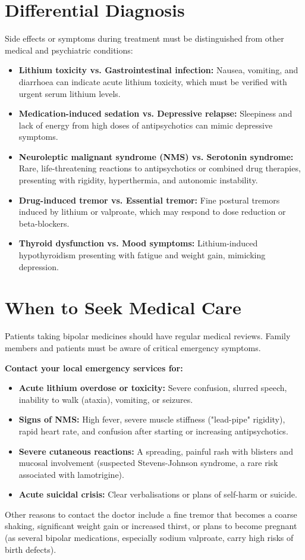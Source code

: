 \section*{Differential Diagnosis}
Side effects or symptoms during treatment must be distinguished from other medical and psychiatric conditions:
\begin{itemize}
    \item \textbf{Lithium toxicity vs. Gastrointestinal infection:} Nausea, vomiting, and diarrhoea can indicate acute lithium toxicity, which must be verified with urgent serum lithium levels.
    \item \textbf{Medication-induced sedation vs. Depressive relapse:} Sleepiness and lack of energy from high doses of antipsychotics can mimic depressive symptoms.
    \item \textbf{Neuroleptic malignant syndrome (NMS) vs. Serotonin syndrome:} Rare, life-threatening reactions to antipsychotics or combined drug therapies, presenting with rigidity, hyperthermia, and autonomic instability.
    \item \textbf{Drug-induced tremor vs. Essential tremor:} Fine postural tremors induced by lithium or valproate, which may respond to dose reduction or beta-blockers.
    \item \textbf{Thyroid dysfunction vs. Mood symptoms:} Lithium-induced hypothyroidism presenting with fatigue and weight gain, mimicking depression.
\end{itemize}

\section*{When to Seek Medical Care}
Patients taking bipolar medicines should have regular medical reviews. Family members and patients must be aware of critical emergency symptoms.

\textbf{Contact your local emergency services for:}
\begin{itemize}
    \item \textbf{Acute lithium overdose or toxicity:} Severe confusion, slurred speech, inability to walk (ataxia), vomiting, or seizures.
    \item \textbf{Signs of NMS:} High fever, severe muscle stiffness ("lead-pipe" rigidity), rapid heart rate, and confusion after starting or increasing antipsychotics.
    \item \textbf{Severe cutaneous reactions:} A spreading, painful rash with blisters and mucosal involvement (suspected Stevens-Johnson syndrome, a rare risk associated with lamotrigine).
    \item \textbf{Acute suicidal crisis:} Clear verbalisations or plans of self-harm or suicide.
\end{itemize}
Other reasons to contact the doctor include a fine tremor that becomes a coarse shaking, significant weight gain or increased thirst, or plans to become pregnant (as several bipolar medications, especially sodium valproate, carry high risks of birth defects).

